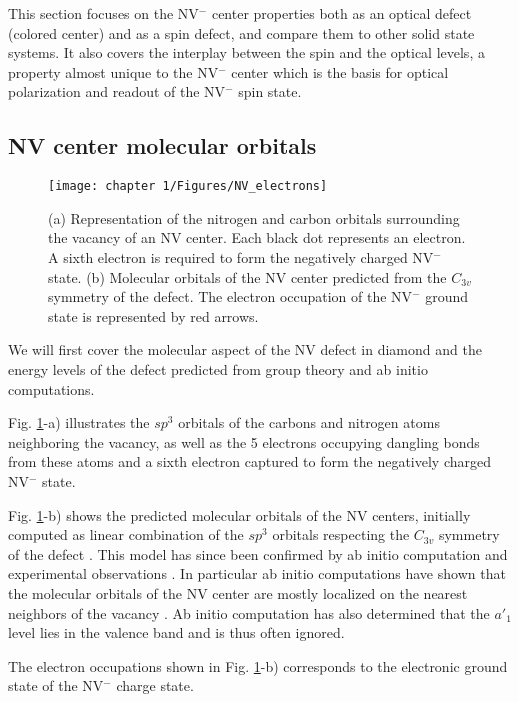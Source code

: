 \documentclass[a4paper, 11pt]{report}
\begin{document}
This section focuses on the NV$^-$ center properties both as an optical defect (colored center) and as a spin defect, and compare them to other solid state systems. It also covers the interplay between the spin and the optical levels, a property almost unique to the NV$^-$ center which is the basis for optical polarization and readout of the NV$^-$ spin state.

\subsection{NV center molecular orbitals}

\begin{figure}[h!]
\centering
\texttt{[image: chapter 1/Figures/NV\_electrons]}
\caption{(a) Representation of the nitrogen and carbon orbitals surrounding the vacancy of an NV center. Each black dot represents an electron. A sixth electron is required to form the negatively charged NV$^-$ state. (b) Molecular orbitals of the NV center predicted from the $C_{3v}$ symmetry of the defect. The electron occupation of the NV$^-$ ground state is represented by red arrows.}
\label{NV electrons}
\end{figure}

We will first cover the molecular aspect of the NV defect in diamond and the energy levels of the defect predicted from group theory and ab initio computations.

Fig. \ref{NV electrons}-a) illustrates the $sp^3$ orbitals of the carbons and nitrogen atoms neighboring the vacancy, as well as the 5 electrons occupying dangling bonds from these atoms and a sixth electron captured to form the negatively charged NV$^-$ state. 

Fig. \ref{NV electrons}-b) shows the predicted molecular orbitals of the NV centers, initially computed as linear combination of the $sp^3$ orbitals respecting the $C_{3v}$ symmetry of the defect \citep{loubser1978electron}. This model has since been confirmed by ab initio computation and experimental observations \citep{doherty2013nitrogen}. In particular ab initio computations have shown that the molecular orbitals of the NV center are mostly localized on the nearest neighbors of the vacancy \citep{gali2008ab}. Ab initio computation has also determined that the $a'_1$ level lies in the valence band and is thus often ignored.

The electron occupations shown in Fig. \ref{NV electrons}-b) corresponds to the electronic ground state of the NV$^-$ charge state.
\end{document}
